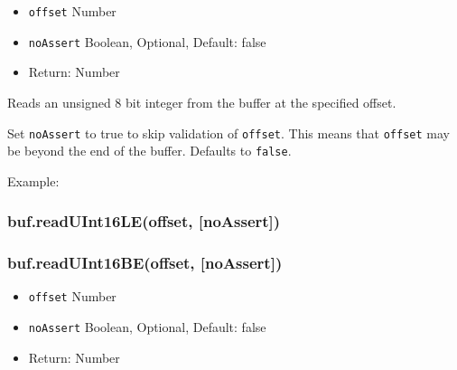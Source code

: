 \begin{itemize}
\itemsep1pt\parskip0pt
\item
  \texttt{offset} Number
\item
  \texttt{noAssert} Boolean, Optional, Default: false
\item
  Return: Number
\end{itemize}

Reads an unsigned 8 bit integer from the buffer at the specified offset.

Set \texttt{noAssert} to true to skip validation of \texttt{offset}.
This means that \texttt{offset} may be beyond the end of the buffer.
Defaults to \texttt{false}.

Example:

\begin{Shaded}
\begin{Highlighting}[]
  \NormalTok{(}\NormalTok{);}

\NormalTok{buf[}\NormalTok{] = }\NormalTok{;}
\NormalTok{buf[}\NormalTok{] = }\NormalTok{;}
\NormalTok{buf[}\NormalTok{] = }\NormalTok{;}
\NormalTok{buf[}\NormalTok{] = }\NormalTok{;}

 
  \NormalTok{(}
\NormalTok{\}}

\end{Highlighting}
\end{Shaded}

\subsubsection{buf.readUInt16LE(offset,
{[}noAssert{]})}\label{buf.readuint16leoffset-noassert}

\subsubsection{buf.readUInt16BE(offset,
{[}noAssert{]})}\label{buf.readuint16beoffset-noassert}

\begin{itemize}
\itemsep1pt\parskip0pt
\item
  \texttt{offset} Number
\item
  \texttt{noAssert} Boolean, Optional, Default: false
\item
  Return: Number
\end{itemize}

